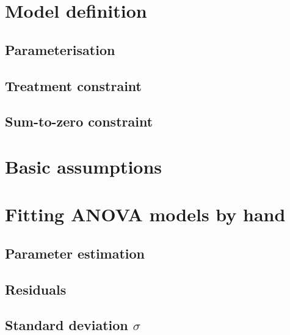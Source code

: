 \documentclass[a4paper,12pt,oneside]{book}
\begin{document}
\hypertarget{model-definition}{%
\section{Model definition}\label{model-definition}}

\hypertarget{parameterisation}{%
\subsection{Parameterisation}\label{parameterisation}}

\hypertarget{treatment-constraint}{%
\subsection{Treatment constraint}\label{treatment-constraint}}

\hypertarget{sum-to-zero-constraint}{%
\subsection{Sum-to-zero constraint}\label{sum-to-zero-constraint}}

\hypertarget{basic-assumptions}{%
\section{Basic assumptions}\label{basic-assumptions}}

\hypertarget{fitting-anova-models-by-hand}{%
\section{Fitting ANOVA models by hand}\label{fitting-anova-models-by-hand}}

\hypertarget{parameter-estimation}{%
\subsection{Parameter estimation}\label{parameter-estimation}}

\hypertarget{residuals}{%
\subsection{Residuals}\label{residuals}}

\hypertarget{standard-deviation-sigma}{%
\subsection{\texorpdfstring{Standard deviation \(\sigma\)}{Standard deviation \textbackslash sigma}}\label{standard-deviation-sigma}}
\end{document}
